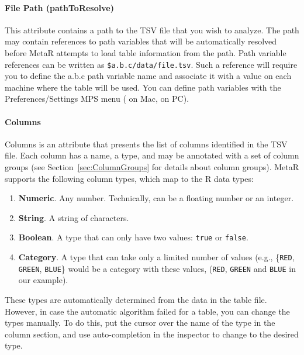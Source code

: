 \paragraph{File Path (pathToResolve)}
This attribute contains a path to the TSV file that you wish to analyze. The path may contain references to path variables that will be automatically resolved before MetaR attempts to load table information from the path. Path variable references can be written as \texttt{\${a.b.c}/data/file.tsv}. Such a reference will require you to define the a.b.c path variable name and associate it with a value on each machine where the table will be used. You can define path variables with the Preferences/Settings MPS menu ( on Mac,  on PC).

\paragraph{Columns}
Columns is an attribute that presents the list of columns identified in the TSV file. Each column has a name, a type, and may be annotated with a set of column groups (see Section~\ref{sec:ColumnGroups} for details about column groups).
MetaR supports the following column types, which map to the R data types:
\begin{enumerate}
	\item \textbf{Numeric}. Any number. Technically, can be a floating number or an integer.
	\item \textbf{String}. A string of characters.
	\item \textbf{Boolean}. A type that can only have two values: \texttt{true} or \texttt{false}.
	\item \textbf{Category}. A type that can take only a limited number of values (e.g., \{\texttt{RED}, \texttt{GREEN}, \texttt{BLUE}\} would be a category with these values, (\texttt{RED}, \texttt{GREEN} and \texttt{BLUE} in our example).
\end{enumerate}
These types are automatically determined from the data in the table file. However, in case the automatic algorithm failed for a table, you can change the types manually. To do this, put the cursor over the name of the type in the column section, and use auto-completion in the inspector to change to the desired type.
 
